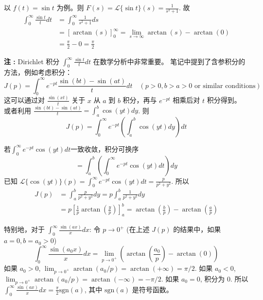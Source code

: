 \documentclass[linespread=1.5,openany]{book}%
\def\diff{d}%
\theoremstyle{plain}
\newcommand{\diff}{\mathop{}\!\mathrm{d}}  %
\begin{document}
{{{{{{								以 $f(t)=\sin t$ 为例。则 $F(s) = \mathcal{L}\{\sin t\}(s) = \frac{1}{s^2+1}$.
								故
								\begin{align*}
									\int_0^\infty \frac{\sin t}{t} \diff t &= \int_0^\infty \frac{1}{s^2+1} \diff s \\[6pt]
									&= \left[ \arctan(s) \right]_0^\infty= \lim_{s\to\infty} \arctan(s) - \arctan(0) \\[6pt]
									&= \frac{\pi}{2} - 0 = \frac{\pi}{2}
								\end{align*}
								
								\textbf{注 :}
								Dirichlet 积分 $\int_0^\infty \frac{\sin t}{t} \diff t$ 在数学分析中非常重要。
								笔记中提到了含参积分的方法，例如考虑积分：
								\[ J(p) = \int_0^\infty e^{-pt} \frac{\sin(bt) - \sin(at)}{t} \diff t \quad (p>0, b>a>0 \text{ or similar conditions}) \]
								这可以通过对 $\frac{\sin(xt)}{t}$ 关于 $x$ 从 $a$ 到 $b$ 积分，再与 $e^{-pt}$ 相乘后对 $t$ 积分得到。
								或者利用 $\frac{\sin(bt)-\sin(at)}{t} = \int_a^b \cos(yt) \diff y$.
								则
								\[		J(p) = \int_0^\infty e^{-pt} \left( \int_a^b \cos(yt) \diff y \right) \diff t \]
								
								若$\int_0^\infty e^{-pt} \cos(yt) dt $一致收敛，积分可换序
								\[	= \int_a^b \left( \int_0^\infty e^{-pt}\cos(yt) \diff t \right) \diff y \]
								已知 $\mathcal{L}\{\cos(yt)\}(p) = \int_0^\infty e^{-pt}\cos(yt) \diff t = \frac{p}{p^2+y^2}$.
								所以
								\begin{align*}
									J(p) &= \int_a^b \frac{p}{p^2+y^2} \diff y = p \int_a^b \frac{1}{p^2+y^2} \diff y \\[6pt]
									&= p \left[ \frac{1}{p} \arctan\left(\frac{y}{p}\right) \right]_a^b = \arctan\left(\frac{b}{p}\right) - \arctan\left(\frac{a}{p}\right)
								\end{align*}
								
								
								特别地，对于 $\int_0^\infty \frac{\sin(ax)}{x} \diff x$:
								令 $p \to 0^+$ (在上述 $J(p)$ 的结果中，如果 $a=0, b=a_0>0$)
								\[ \int_0^\infty \frac{\sin(a_0 x)}{x} \diff x = \lim_{p\to 0^+} \left( \arctan\left(\frac{a_0}{p}\right) - \arctan(0) \right) \]
								如果 $a_0 > 0$, $\lim_{p\to 0^+} \arctan(a_0/p) = \arctan(+\infty) = \pi/2$.
								如果 $a_0 < 0$, $\lim_{p\to 0^+} \arctan(a_0/p) = \arctan(-\infty) = -\pi/2$.
								如果 $a_0 = 0$, 积分为 $0$.
								所以 $\int_0^\infty \frac{\sin(ax)}{x} \diff x = \frac{\pi}{2} \text{sgn}(a)$, 其中 $\text{sgn}(a)$ 是符号函数。
								
}}}}}}
\end{document}
